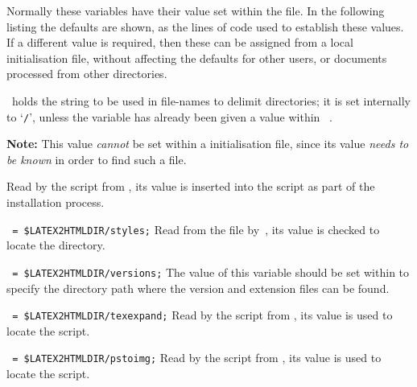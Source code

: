 Normally these variables have their value set within the  file.
In the following listing the defaults are shown, as the lines of \Perl{} code
used to establish these values.
If a different value is required, then these can be assigned from
a local  initialisation file, 
without affecting the defaults for other users, 
or documents processed from other directories.

\begin{htmllist}%
%
%
\item [\fn{\$dd} ]
~holds the string to be used in file-names to delimit directories;
it is set internally to `\texttt{/}', unless the variable has already been given
a value within ~.

\noindent
\textbf{Note:} This value \emph{cannot} be set within a  
initialisation file, since its value \emph{needs to be known} 
in order to find such a file.

%
\item [\fn{\$LATEX2HTMLDIR}] \latex{ }%
Read by the  script from , 
its value is inserted into the  \Perl{} script as part
of the installation process.

\item [\fn{\$LATEX2HTMLSTYLES}\texttt{ = \char34\$LATEX2HTMLDIR/styles\char34;}]
Read from the  file by \,,
its value is checked to locate the  directory.

\item [\fn{\$LATEX2HTMLVERSIONS}\texttt{ = \char34\$LATEX2HTMLDIR/versions\char34;}]
The value of this variable should be set within  
to specify the directory path where the version and extension files can be found.

%
\item [\fn{\$TEXEXPAND}\texttt{  = \char34\$LATEX2HTMLDIR/texexpand\char34;}]
Read by the  \Perl{} script from , 
its value is used to locate the  \Perl{} script.

\item [\fn{\$PSTOIMG}\texttt{ = \char34\$LATEX2HTMLDIR/pstoimg\char34;}]
Read by the  \Perl{} script from , 
its value is used to locate the  \Perl{} script.


\end{htmllist}
